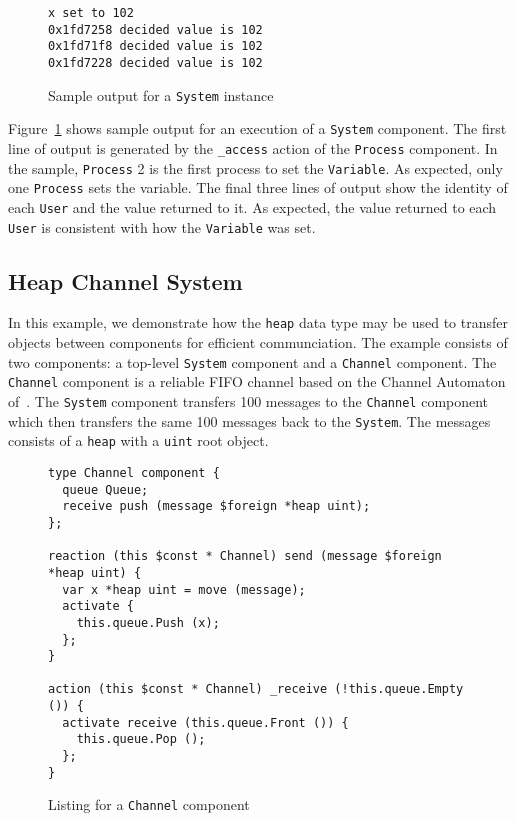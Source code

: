 \begin{figure}
\begin{verbatim}
x set to 102
0x1fd7258 decided value is 102
0x1fd71f8 decided value is 102
0x1fd7228 decided value is 102
\end{verbatim}
\cprotect\caption{Sample output for a \verb+System+ instance\label{system_output}}
\end{figure}

Figure~\ref{system_output} shows sample output for an execution of a \verb+System+ component.
The first line of output is generated by the \verb+_access+ action of the \verb+Process+ component.
In the sample, \verb+Process+ 2 is the first process to set the \verb+Variable+.
As expected, only one \verb+Process+ sets the variable.
The final three lines of output show the identity of each \verb+User+ and the value returned to it.
As expected, the value returned to each \verb+User+ is consistent with how the \verb+Variable+ was set.

\subsection{Heap Channel System}

In this example, we demonstrate how the \verb+heap+ data type may be used to transfer objects between components for efficient communciation.
The example consists of two components:  a top-level \verb+System+ component and a \verb+Channel+ component.
The \verb+Channel+ component is a reliable FIFO channel based on the Channel Automaton of~\cite{nancy1996distributed}.
The \verb+System+ component transfers 100 messages to the \verb+Channel+ component which then transfers the same 100 messages back to the \verb+System+.
The messages consists of a \verb+heap+ with a \verb+uint+ root object.

\begin{figure}
\begin{verbatim}
type Channel component {
  queue Queue;
  receive push (message $foreign *heap uint);
};

reaction (this $const * Channel) send (message $foreign *heap uint) {
  var x *heap uint = move (message);
  activate {
    this.queue.Push (x);
  };
}

action (this $const * Channel) _receive (!this.queue.Empty ()) {
  activate receive (this.queue.Front ()) {
    this.queue.Pop ();
  };
}
\end{verbatim}
\cprotect\caption{Listing for a \verb+Channel+ component\label{channel_listing}}
\end{figure}

